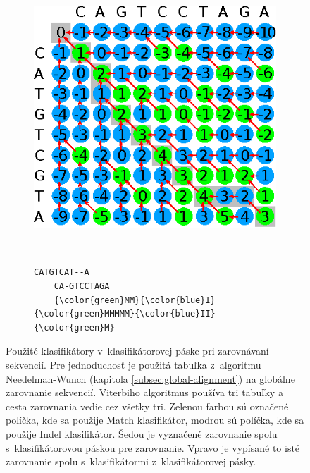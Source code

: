 \begin{figure}[htp]
    \centering
    \begin{subfigure}[m]{0.5\textwidth}
    \centering
    \includegraphics[width=\textwidth]{images/clf_tape}
    \end{subfigure}
    ~
    \begin{subfigure}[m]{0.3\textwidth}
    \centering
    \begin{BVerbatim}[commandchars=\\\{\}]
    CATGTCAT--A
    CA-GTCCTAGA
    {\color{green}MM}{\color{blue}I}{\color{green}MMMMM}{\color{blue}II}{\color{green}M}
    \end{BVerbatim}
    \end{subfigure}
    \caption[Použité klasifikátory v~klasifikátorovej páske]{Použité klasifikátory v~klasifikátorovej páske pri zarovnávaní sekvencií. Pre jednoduchosť je použitá tabuľka z~algoritmu Needelman-Wunch (kapitola \ref{subsec:global-alignment}) na globálne zarovnanie sekvencií. Viterbiho algoritmus používa tri tabuľky a cesta zarovnania vedie cez všetky tri. Zelenou farbou sú označené políčka, kde sa použije Match klasifikátor, modrou sú políčka, kde sa použije Indel klasifikátor. Šedou je vyznačené zarovnanie spolu s~klasifikátorovou páskou pre zarovnanie. Vpravo je vypísané to isté zarovnanie spolu s~klasifikátormi z~klasifikátorovej pásky.}
    \label{fig:clf-tape}
\end{figure}

